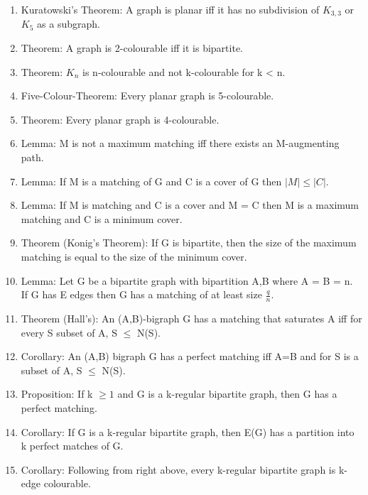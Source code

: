 \documentclass[]{article}
\begin{document}
\begin{enumerate}
\item
  Kuratowski's Theorem: A graph is planar iff it has no subdivision of
  $K_{3,3}$ or $K_5$ as a subgraph.
\item
  Theorem: A graph is 2-colourable iff it is bipartite.
\item
  Theorem: $K_n$ is n-colourable and not k-colourable for k \textless{}
  n.
\item
  Five-Colour-Theorem: Every planar graph is 5-colourable.
\item
  Theorem: Every planar graph is 4-colourable.
\item
  Lemma: M is not a maximum matching iff there exists an M-augmenting
  path.
\item
  Lemma: If M is a matching of G and C is a cover of G then
  $|M| \leq |C|$.
\item
  Lemma: If M is matching and C is a cover and \textbar{}M\textbar{} =
  \textbar{}C\textbar{} then M is a maximum matching and C is a minimum
  cover.
\item
  Theorem (Konig's Theorem): If G is bipartite, then the size of the
  maximum matching is equal to the size of the minimum cover.
\item
  Lemma: Let G be a bipartite graph with bipartition A,B where
  \textbar{}A\textbar{} = \textbar{}B\textbar{} = n. If G has
  \textbar{}E\textbar{} edges then G has a matching of at least size
  $\frac{q}{n}$.
\item
  Theorem (Hall's): An (A,B)-bigraph G has a matching that saturates A
  iff for every S subset of A, \textbar{}S\textbar{} $\leq$
  \textbar{}N(S)\textbar{}.
\item
  Corollary: An (A,B) bigraph G has a perfect matching iff
  \textbar{}A\textbar{}=\textbar{}B\textbar{} and for S is a subset of
  A, \textbar{}S\textbar{} $\leq$ \textbar{}N(S)\textbar{}.
\item
  Proposition: If k $\geq 1$ and G is a k-regular bipartite graph, then
  G has a perfect matching.
\item
  Corollary: If G is a k-regular bipartite graph, then E(G) has a
  partition into k perfect matches of G.
\item
  Corollary: Following from right above, every k-regular bipartite graph
  is k-edge colourable.
\end{enumerate}
\end{document}
